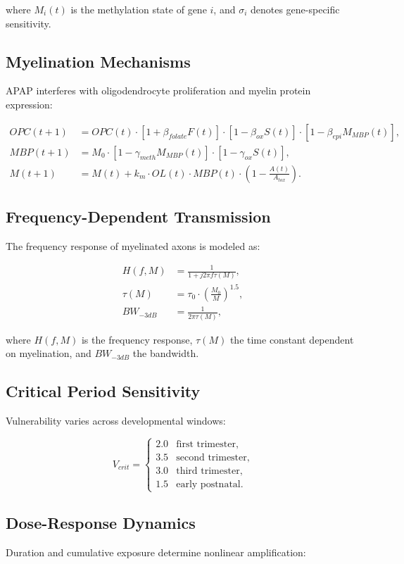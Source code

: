 \documentclass[12pt]{article}
\begin{document}
where $M_i(t)$ is the methylation state of gene $i$, and $\sigma_i$ denotes gene-specific sensitivity.

\subsection{Myelination Mechanisms}
APAP interferes with oligodendrocyte proliferation and myelin protein expression:

\begin{align}
OPC(t+1) &= OPC(t) \cdot [1 + \beta_{folate}F(t)] \cdot [1 - \beta_{ox}S(t)] \cdot [1 - \beta_{epi}M_{MBP}(t)], \\
MBP(t+1) &= M_0 \cdot [1 - \gamma_{meth}M_{MBP}(t)] \cdot [1 - \gamma_{ox}S(t)], \\
M(t+1) &= M(t) + k_m \cdot OL(t) \cdot MBP(t) \cdot \left(1 - \frac{A(t)}{A_{tox}}\right).
\end{align}

\subsection{Frequency-Dependent Transmission}
The frequency response of myelinated axons is modeled as:

\begin{align}
H(f,M) &= \frac{1}{1 + j2\pi f \tau(M)}, \\
\tau(M) &= \tau_0 \cdot \left(\frac{M_0}{M}\right)^{1.5}, \\
BW_{-3dB} &= \frac{1}{2\pi\tau(M)},
\end{align}

where $H(f,M)$ is the frequency response, $\tau(M)$ the time constant dependent on myelination, and $BW_{-3dB}$ the bandwidth.

\subsection{Critical Period Sensitivity}
Vulnerability varies across developmental windows:

\[
V_{crit} = \begin{cases}
2.0 & \text{first trimester}, \\
3.5 & \text{second trimester}, \\
3.0 & \text{third trimester}, \\
1.5 & \text{early postnatal}.
\end{cases}
\]

\subsection{Dose-Response Dynamics}
Duration and cumulative exposure determine nonlinear amplification:
\end{document}
